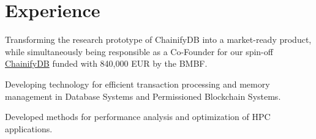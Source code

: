 \documentclass[]{deedy-resume-openfont}
\begin{document}
\begin{minipage}[t]{0.66\textwidth}

\section{Experience}

Transforming the research prototype of ChainifyDB into a market-ready product, while simultaneously being responsible as a Co-Founder for our spin-off \href{www.chainifydb.com}{ChainifyDB} funded with 840,000 EUR by the BMBF.
\sectionsep

Developing technology for efficient transaction processing and memory management in Database Systems and Permissioned Blockchain Systems.
\sectionsep

Developed methods for performance analysis and optimization of HPC applications.
\sectionsep


\end{minipage} 
\end{document}
